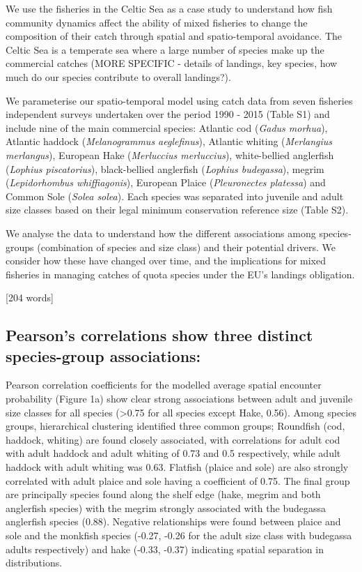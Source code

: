 \documentclass{nature}
\begin{document}
\begin{linenumbers}
We use the fisheries in the Celtic Sea as a case study to understand how fish
community dynamics affect the ability of mixed fisheries to change the
composition of their catch through spatial and spatio-temporal avoidance. The
Celtic Sea is a temperate sea where a large number of species make up the
commercial catches (MORE SPECIFIC - details of landings, key species, how much
do our species contribute to overall landings?).

We parameterise our spatio-temporal model using catch data from seven fisheries
independent surveys undertaken over the period 1990 - 2015 (Table S1) and
include nine of the main commercial species: Atlantic cod (\textit{Gadus
	morhua}), Atlantic haddock (\textit{Melanogrammus aeglefinus}),
Atlantic whiting (\textit{Merlangius merlangus}), European
Hake (\textit{Merluccius merluccius}), white-bellied anglerfish (\textit{Lophius
	piscatorius}), black-bellied anglerfish (\textit{Lophius budegassa}),
megrim (\textit{Lepidorhombus whiffiagonis}), European Plaice
(\textit{Pleuronectes platessa}) and Common Sole (\textit{Solea solea}).  Each
species was separated into juvenile and adult size classes based on their legal
minimum conservation reference size (Table S2).

We analyse the data to understand how the different associations among
species-groups (combination of species and size class) and their potential
drivers. We consider how these have changed over time, and the implications for
mixed fisheries in managing catches of quota species under the EU's landings
obligation.

[204 words]

\subsection{Pearson's correlations show three distinct species-group
	associations:} 
Pearson correlation coefficients for the modelled average spatial encounter
probability (Figure 1a) show clear strong associations between adult and
juvenile size classes for all species (\textgreater 0.75 for all species except
Hake, 0.56).  Among species groups, hierarchical clustering identified three
common groups; Roundfish (cod, haddock, whiting) are found closely associated,
with correlations for adult cod with adult haddock and adult whiting of 0.73
and 0.5 respectively, while adult haddock with adult whiting was 0.63. Flatfish
(plaice and sole) are also strongly correlated with adult plaice and sole
having a coefficient of 0.75.  The final group are principally species found
along the shelf edge (hake, megrim and both anglerfish species) with the megrim
strongly associated with the budegassa anglerfish species (0.88). Negative
relationships were found between plaice and sole and the monkfish species
(-0.27, -0.26 for the adult size class with budegassa adults respectively) and
hake (-0.33, -0.37) indicating spatial separation in distributions.


\end{linenumbers}
\end{document}
